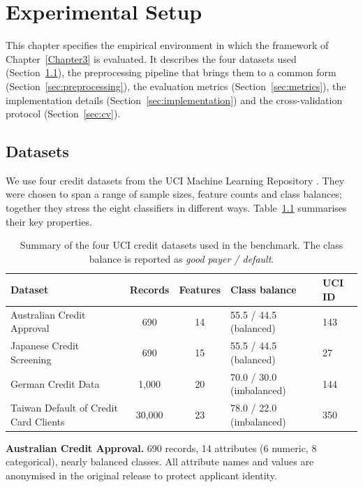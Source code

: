 \chapter{Experimental Setup}\doublespacing
\label{Chapter4}

This chapter specifies the empirical environment in which the
framework of Chapter~\ref{Chapter3} is evaluated. It describes
the four datasets used (Section~\ref{sec:datasets}), the
preprocessing pipeline that brings them to a common form
(Section~\ref{sec:preprocessing}), the evaluation metrics
(Section~\ref{sec:metrics}), the implementation details
(Section~\ref{sec:implementation}) and the cross-validation
protocol (Section~\ref{sec:cv}).

\section{Datasets}
\label{sec:datasets}

We use four credit datasets from the UCI Machine Learning
Repository \citep{ucimlrepo}. They were chosen to span a range of
sample sizes, feature counts and class balances; together they
stress the eight classifiers in different ways.
Table~\ref{tab:datasets} summarises their key properties.

\begin{table}[H]
\centering
\caption{Summary of the four UCI credit datasets used in the
benchmark. The class balance is reported as \emph{good payer /
default}.}
\singlespacing
\label{tab:datasets}
\small
\renewcommand{\arraystretch}{1.2}
\begin{tabular}{l c c l l}
\toprule
\textbf{Dataset} & \textbf{Records} & \textbf{Features} & \textbf{Class balance} & \textbf{UCI ID}\\
\midrule
Australian Credit Approval & 690 & 14 & 55.5 / 44.5 (balanced) & 143\\
Japanese Credit Screening & 690 & 15 & 55.5 / 44.5 (balanced) & 27\\
German Credit Data & 1{,}000 & 20 & 70.0 / 30.0 (imbalanced) & 144\\
Taiwan Default of Credit Card Clients & 30{,}000 & 23 & 78.0 / 22.0 (imbalanced) & 350\\
\bottomrule
\end{tabular}
\end{table}
\textbf{Australian Credit Approval.} 690 records, 14 attributes
(6 numeric, 8 categorical), nearly balanced classes. All attribute
names and values are anonymised in the original release to protect
applicant identity.

